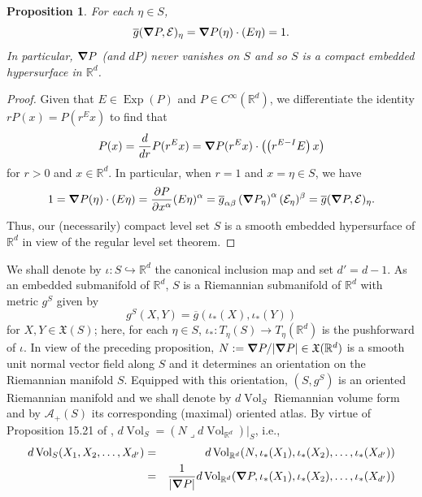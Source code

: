 \documentclass[11pt]{article}
\newtheorem{proposition}[theorem]{Proposition}
\theoremstyle{remark}
\newcommand\Exp{\operatorname{Exp}}
\newcommand{\Vol}{\operatorname{Vol}}
\newcommand{\iprod}{\mathbin{\lrcorner}}
\begin{document}
\begin{proposition}\label{prop:InnerProdIsOne}
For each $\eta\in S$, 
\begin{equation*}
    \overline{g}(\grad P,\mathcal{E})_{\eta}=\grad P(\eta)\cdot (E\eta)=1.
\end{equation*}
In particular, $\grad P$ (and $dP$) never vanishes on $S$ and so $S$ is a compact embedded hypersurface in $\mathbb{R}^d$.
\end{proposition}
\begin{proof}
Given that $E\in\Exp(P)$ and $P\in C^\infty(\mathbb{R}^d)$, we differentiate the identity $rP(x)=P(r^Ex)$ to find that
\begin{equation*}
    P(x)=\frac{d}{dr}P(r^Ex)=\grad P(r^Ex)\cdot\left(\left(r^{E-I}E\right)x\right)
\end{equation*}
for $r>0$ and $x\in\mathbb{R}^d$. In particular, when $r=1$ and $x=\eta\in S$, we have
\begin{equation*}
    1=\grad P(\eta)\cdot \left(E\eta\right)=\frac{\partial P}{\partial x^\alpha}(E\eta)^\alpha=\overline{g}_{\alpha \beta}\left(\grad P_\eta\right)^{\alpha}(\mathcal{E}_\eta)^\beta=\overline{g}(\grad P,\mathcal{E})_\eta.
\end{equation*}
Thus, our (necessarily) compact level set $S$ is a smooth embedded hypersurface of $\mathbb{R}^d$ in view of the regular level set theorem.
\end{proof}
\noindent We shall denote by $\iota:  S \hookrightarrow \mathbb{R}^d$ the canonical inclusion map and set $d'=d-1$. As an embedded submanifold of $\mathbb{R}^d$, $S$ is a Riemannian submanifold of $\mathbb{R}^d$ with metric $g^S$ given by
\begin{equation*}
    g^S(X,Y)=\overline{g}(\iota_*(X),\iota_*(Y))
\end{equation*}
for $X,Y\in\mathfrak{X}(S)$; here, for each $\eta\in S$,  $\iota_*:T_\eta(S)\to T_\eta(\mathbb{R}^d)$ is the pushforward of $\iota$.  In view of the preceding proposition, $N:=\grad P/|\grad P|\in \mathfrak{X}(\mathbb{R}^d)$ is a smooth unit normal vector field along $S$ and it determines an orientation on the Riemannian manifold $S$. Equipped with this orientation, $(S,g^S)$ is an oriented Riemannian manifold and we shall denote by $d\Vol_S$ Riemannian volume form and by $\mathcal{A}_+(S)$ its corresponding (maximal) oriented atlas. By virtue of Proposition 15.21 of \cite{lee2013smooth}, $d\Vol_S=(N\iprod d\Vol_{\mathbb{R}^d})\vert_S$, i.e.,
\begin{eqnarray*}
    d\Vol_S(X_1,X_2,\dots,X_{d'})&=&d\Vol_{\mathbb{R}^d}(N,\iota_*(X_1),\iota_*(X_2),\dots,\iota_*(X_{d'}))\\
    &=&\frac{1}{|\grad P|}d\Vol_{\mathbb{R}^d}(\grad P,\iota_*(X_1),\iota_*(X_2),\dots,\iota_*(X_{d'}))
\end{eqnarray*}
\end{document}

